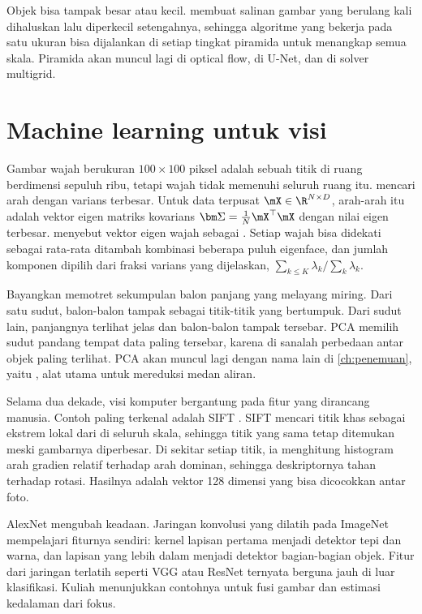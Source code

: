 Objek bisa tampak besar atau kecil.  membuat salinan gambar yang berulang
kali dihaluskan lalu diperkecil setengahnya, sehingga algoritme yang bekerja pada satu ukuran
bisa dijalankan di setiap tingkat piramida untuk menangkap semua skala. Piramida akan muncul lagi
di optical flow, di U-Net, dan di solver multigrid.

\section{Machine learning untuk visi}

Gambar wajah berukuran $100\times100$ piksel adalah sebuah titik di ruang berdimensi sepuluh ribu,
tetapi wajah tidak memenuhi seluruh ruang itu. 
\citep{pearson1901,hotelling1933} mencari arah dengan varians terbesar. Untuk data terpusat
$\mX\in\R^{N\times D}$, arah-arah itu adalah vektor eigen matriks kovarians
$\bm\Sigma=\tfrac1N\mX^\top\mX$ dengan nilai eigen terbesar. \citet{turk1991} menyebut vektor eigen
wajah sebagai . Setiap wajah bisa didekati sebagai rata-rata ditambah kombinasi
beberapa puluh eigenface, dan jumlah komponen dipilih dari fraksi varians yang dijelaskan,
$\sum_{k\le K}\lambda_k/\sum_k\lambda_k$.

Bayangkan memotret sekumpulan balon panjang yang melayang miring. Dari satu sudut, balon-balon
tampak sebagai titik-titik yang bertumpuk. Dari sudut lain, panjangnya terlihat jelas dan
balon-balon tampak tersebar. PCA memilih sudut pandang tempat data paling tersebar, karena di
sanalah perbedaan antar objek paling terlihat. PCA akan muncul lagi dengan nama lain di
\cref{ch:penemuan}, yaitu , alat utama untuk mereduksi medan
aliran.

Selama dua dekade, visi komputer bergantung pada fitur yang dirancang manusia. Contoh paling
terkenal adalah SIFT \citep{lowe2004}. SIFT mencari titik khas sebagai ekstrem lokal dari
 di seluruh skala, sehingga titik yang sama tetap ditemukan meski
gambarnya diperbesar. Di sekitar setiap titik, ia menghitung histogram arah gradien relatif
terhadap arah dominan, sehingga deskriptornya tahan terhadap rotasi. Hasilnya adalah vektor 128
dimensi yang bisa dicocokkan antar foto.

AlexNet \citep{krizhevsky2017} mengubah keadaan. Jaringan konvolusi yang dilatih pada ImageNet
mempelajari fiturnya sendiri: kernel lapisan pertama menjadi detektor tepi dan warna, dan lapisan
yang lebih dalam menjadi detektor bagian-bagian objek. Fitur dari jaringan terlatih seperti VGG
atau ResNet ternyata berguna jauh di luar klasifikasi. Kuliah menunjukkan contohnya untuk fusi
gambar dan estimasi kedalaman dari fokus.

